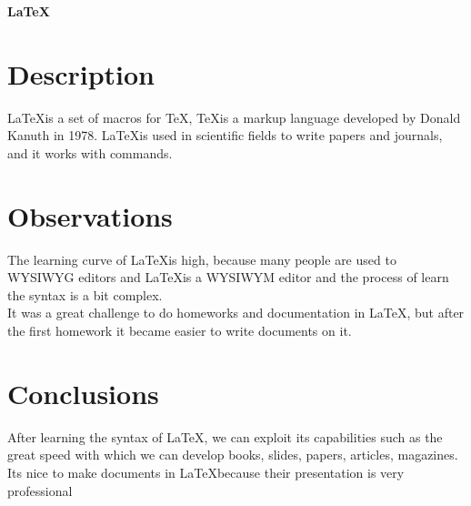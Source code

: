 \textbf{\LaTeX}


\section{Description}
\LaTeX is a set of macros for \TeX, \TeX is a markup language developed by Donald Kanuth in 1978. \LaTeX is used in scientific fields to write papers and journals, and it works with commands.\\

\section{Observations}
The learning curve of \LaTeX is high, because many people are used to WYSIWYG editors and \LaTeX is a WYSIWYM editor and the process of learn the syntax is a bit complex.\\
It was a great challenge to do homeworks and documentation in \LaTeX, but after the first homework it became easier to write documents on it.
 
\section{Conclusions}
After learning the syntax of LaTeX, we can exploit its capabilities such as the great speed with which we can develop books, slides, papers, articles, magazines. Its nice to make documents in \LaTeX because their presentation is very professional


